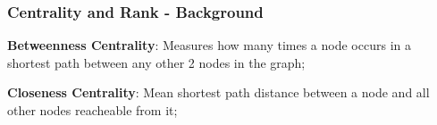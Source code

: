 \documentclass[9pt]{beamer}
\begin{document}
\begin{frame}
\frametitle{Centrality and Rank - Background}

\textbf{Betweenness Centrality}: Measures how many times a node occurs in a shortest path between any other 2 nodes in the graph;

\textbf{Closeness Centrality}: Mean shortest path distance between a node and all other nodes reacheable from it;

\end{frame}








\end{document}
